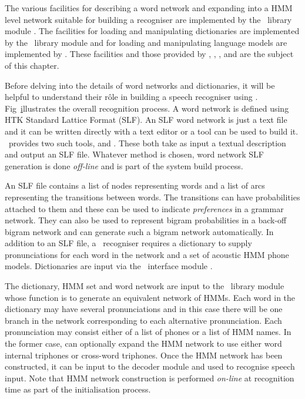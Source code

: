 The various facilities for describing a word network and expanding into a
HMM level network suitable for building a recogniser are implemented
by the \HTK\ library module .  The facilities for loading
and manipulating dictionaries are implemented by the \HTK\ library module
 and  for loading
and manipulating language models are implemented by
.  These facilities and those provided by 
, , , 
 and  are
the subject of this chapter.


Before delving into the details of word networks and dictionaries, it will
be helpful to understand their r\^{o}le in building a speech recogniser
using \HTK.  Fig~\href{f:recsys} illustrates the overall recognition
process.  A word network is defined using HTK Standard Lattice Format
(SLF).  An SLF word network is just a text file and it can be written
directly with a text editor or a tool can be used to build it. \HTK\ provides 
two such tools,  and
.  These both take as input a textual description and
output an SLF file. 
Whatever method is chosen, word network SLF generation 
is done \textit{off-line}
and is part of the system build process.

An SLF file contains a list of nodes representing words and a
list of arcs representing the transitions between words.   The transitions
can have probabilities attached to them and these can be used to indicate
\textit{preferences} in a grammar network.  They can also be used to
represent bigram probabilities in a back-off bigram network and 
 can generate such a bigram network automatically.
In addition to an SLF file, a \HTK\ recogniser requires a 
dictionary to supply pronunciations for each word in the network
and a set of acoustic HMM phone models. 
Dictionaries are input via the \HTK\ interface module .

The dictionary, HMM set and word network are input to the \HTK\ library
module  whose function is to generate an equivalent network of
HMMs. Each word in the dictionary may have several pronunciations and in
this case there will be one branch in the network corresponding to each
alternative pronunciation. Each pronunciation may consist either of a list
of phones or a list of HMM names. In the former case,  can
optionally expand the HMM network to use either word internal triphones or
cross-word triphones.
Once the HMM network has been constructed, it can be
input to the decoder module  and used to recognise
speech input.  Note that HMM network construction is performed \textit{on-line}
at recognition time as part of the initialisation process.

